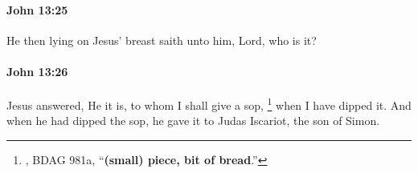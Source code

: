 		\paragraph{John 13:25} %
			\label{JOHN-13-25}

			He then lying on Jesus' breast saith unto him, Lord, who is it?

			\begin{framed}
				\scriptsize
				\begin{compactdesc}
					\item[SBLG] 
				\end{compactdesc}
			\end{framed}

		\paragraph{John 13:26} %
			\label{JOHN-13-26}

			Jesus answered, He it is, to whom I shall give a sop,%
				\footnote{%
					, BDAG 981a, ``\textbf{(small) piece, bit of bread}.''}
			when I have dipped it. And when he had dipped the sop, he gave it to Judas Iscariot, the son of Simon.

